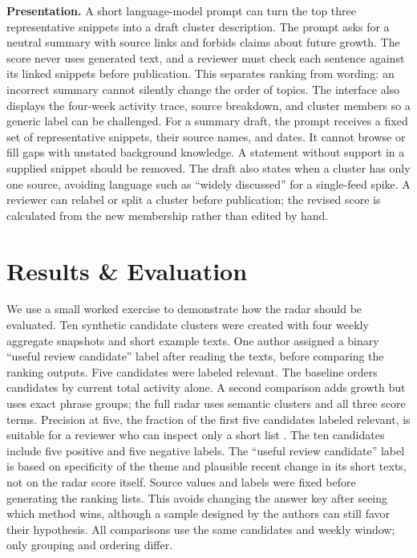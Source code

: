 \documentclass[../../proceedings/main.tex]{subfiles}
\begin{document}
\begin{refsection}
\textbf{Presentation.} A short language-model prompt can turn the top three
representative snippets into a draft cluster description. The prompt asks for
a neutral summary with source links and forbids claims about future growth.
The score never uses generated text, and a reviewer must check each sentence
against its linked snippets before publication. This separates ranking from
wording: an incorrect summary cannot silently change the order of topics.
The interface also displays the four-week activity trace, source breakdown,
and cluster members so a generic label can be challenged.
For a summary draft, the prompt receives a fixed set of representative
snippets, their source names, and dates. It cannot browse or fill gaps with
unstated background knowledge. A statement without support in a supplied
snippet should be removed. The draft also states when a cluster has only one
source, avoiding language such as ``widely discussed'' for a single-feed
spike. A reviewer can relabel or split a cluster before publication; the
revised score is calculated from the new membership rather than edited by
hand.

\section{Results \& Evaluation}
We use a small worked exercise to demonstrate how the radar should be
evaluated. Ten synthetic candidate clusters were created with four weekly
aggregate snapshots and short example texts. One author assigned a binary
``useful review candidate'' label after reading the texts, before comparing
the ranking outputs. Five candidates were labeled relevant. The baseline
orders candidates by current total activity alone. A second comparison adds
growth but uses exact phrase groups; the full radar uses semantic clusters
and all three score terms. Precision at five, the fraction of the first five
candidates labeled relevant, is suitable for a reviewer who can inspect only
a short list \autocite{manning2008ir}.
The ten candidates include five positive and five negative labels. The
``useful review candidate'' label is based on specificity of the theme and
plausible recent change in its short texts, not on the radar score itself.
Source values and labels were fixed before generating the ranking lists.
This avoids changing the answer key after seeing which method wins, although
a sample designed by the authors can still favor their hypothesis. All
comparisons use the same candidates and weekly window; only grouping and
ordering differ.


\end{refsection}
\end{document}
